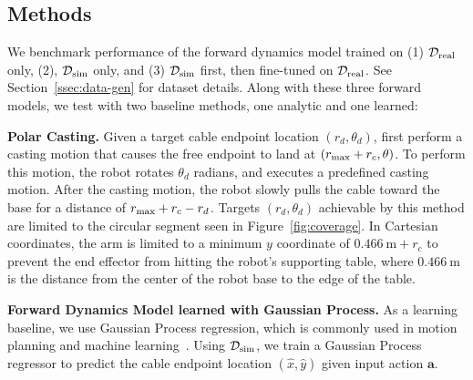 \documentclass[letterpaper, 10 pt, conference]{ieeeconf}  %
\newcommand{\ba}{\mathbf{a}}
\begin{document}
\subsection{Methods}\label{ssection:methods}

We benchmark performance of the forward dynamics model trained on (1) $\mathcal{D}_{\rm real}$ only, (2), $\mathcal{D}_{\rm sim}$ only, and (3) $\mathcal{D}_{\rm sim}$ first, then fine-tuned on $\mathcal{D}_{\rm real}$. See Section~\ref{ssec:data-gen} for dataset details. Along with these three forward models, we test with two baseline methods, one analytic and one learned:

\textbf{Polar Casting.} Given a target cable endpoint location $(r_d, \theta_d)$, first perform a casting motion that causes the free endpoint to land at $(r_{\rm max} + r_c, \theta)$. To perform this motion, the robot rotates $\theta_d$ radians, and executes a predefined casting motion. After the casting motion, the robot slowly pulls the cable toward the base for a distance of $r_{\rm max} + r_c - r_d$. Targets $(r_d, \theta_d)$ achievable by this method are limited to the circular segment seen in Figure~\ref{fig:coverage}. In Cartesian coordinates, the arm is limited to a minimum $y$ coordinate of $\SI{0.466}{\meter}+r_c$ to prevent the end effector from hitting the robot's supporting table, where $\SI{0.466}{\meter}$ is the distance from the center of the robot base to the edge of the table. 


\textbf{Forward Dynamics Model learned with Gaussian Process.} As a learning baseline, we use Gaussian Process regression, which is commonly used in motion planning and machine learning~\cite{Gaussian_process_ML}. Using $\mathcal{D}_{\rm sim}$, we train a Gaussian Process regressor to predict the cable endpoint location  $(\hat{x}, \hat{y})$ given input action $\ba$.


\end{document}
